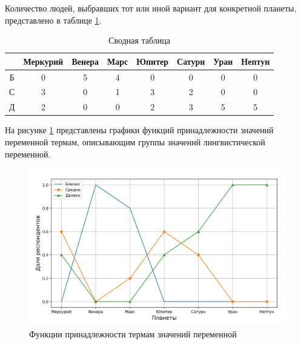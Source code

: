 Количество людей, выбравших тот или иной вариант для конкретной планеты, представлено в таблице \ref{tabular:pivot}.
\clearpage

\begin{table}[h!]
	\begin{center}
	    \begin{threeparttable}
	    \captionsetup{justification=raggedright, singlelinecheck=off}
	    \caption{\label{tabular:pivot} Сводная таблица}
		\begin{tabular}{|c|c|c|c|c|c|c|c|}
                \hline
                & Меркурий & Венера & Марс & Юпитер & Сатурн & Уран & Нептун \tabularnewline 
                \hline
                Б & 0 & 5 & 4 & 0 & 0 & 0 & 0 \\
                \hline
                С & 3 & 0 & 1 & 3 & 2 & 0 & 0 \\
			\hline
                Д & 2 & 0 & 0 & 2 & 3 & 5 & 5 \\
                \hline
		\end{tabular}
		\end{threeparttable}
	\end{center}
\end{table}

На рисунке \ref{fig:answers} представлены графики функций принадлежности значений переменной термам, описывающим группы значений лингвистической переменной.

\begin{figure}[h!btp]
	\centering
	\includegraphics[width=450pt]{inc/answers.png}
	\caption{Функции принадлежности термам значений переменной}
	\label{fig:answers}	
\end{figure}

\vspace{\baselineskip}
